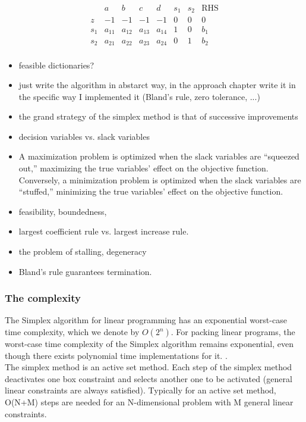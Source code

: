 \begin{equation*}
    \begin{array}{ccccccc|c}
      & a & b & c & d & s_1 & s_2 & \text{RHS} \\
      \hline
      z & -1 & -1 & -1 & -1 & 0 & 0 & 0 \\
      \hline
      s_1 & a_{11} & a_{12} & a_{13} & a_{14} & 1 & 0 & b_1 \\
      s_2 & a_{21} & a_{22}& a_{23} & a_{24}& 0 & 1 & b_2 \\
    \end{array}
\end{equation*}
\begin{itemize}
    \item feasible dictionaries? 
    \item just write the algorithm in abstarct way, in the approach chapter write it in the 
    specific way I implemented it (Bland's rule, zero tolerance, ...)
    \item the grand strategy of the simplex method is that of successive improvements
    \item decision variables vs. slack variables
    \item A maximization problem is optimized when the slack variables are “squeezed out,” maximizing the true variables’ effect on the objective function. Conversely, a minimization problem is optimized when the slack variables are “stuffed,” 
    minimizing the true variables’ effect on the objective function.
    \item feasibility, boundedness, 
    \item largest coefficient rule vs. largest increase rule.
    \item the problem of stalling, degeneracy
    \item Bland's rule guarantees termination.
    
\end{itemize}

\subsubsection{The complexity}
The Simplex algorithm for linear programming has an 
exponential worst-case time complexity, which we denote by \( O(2^n) \).
For packing linear programs, the worst-case time complexity of the Simplex algorithm 
remains exponential, even though there exists polynomial time implementations for it.
\parencite{stille2010solution}.
\\
The simplex method is an active set method.
Each step of the simplex method deactivates one box constraint and 
selects another one to be activated (general linear constraints are 
always satisfied).
Typically for an active set method, O(N+M) steps are needed for 
an N-dimensional problem with M general linear constraints.
